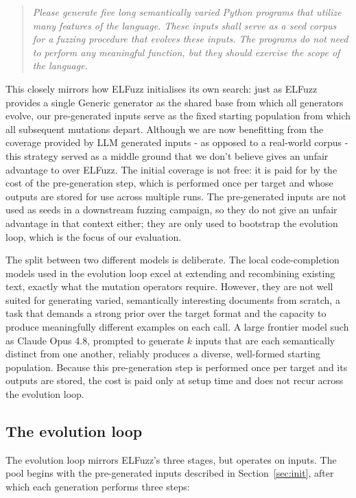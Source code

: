 \begin{quote}
\itshape Please generate five long semantically varied Python programs that utilize many features of the language. These inputs shall serve as a seed corpus for a fuzzing procedure that evolves these inputs. The programs do not need to perform any meaningful function, but they should exercise the scope of the language.
\end{quote}

This closely mirrors how ELFuzz initialises its own search: just as ELFuzz provides a single Generic generator as the shared base from which all generators evolve, our pre-generated inputs serve as the fixed starting population from which all subsequent mutations depart. Although we are now benefitting from the coverage provided by LLM generated inputs - as opposed to a real-world corpus - this strategy served as a middle ground that we don't believe gives an unfair advantage to \toolname{} over ELFuzz. The initial coverage is not free: it is paid for by the cost of the pre-generation step, which is performed once per target and whose outputs are stored for use across multiple runs. The pre-generated inputs are not used as seeds in a downstream fuzzing campaign, so they do not give \toolname{} an unfair advantage in that context either; they are only used to bootstrap the evolution loop, which is the focus of our evaluation.

The split between two different models is deliberate. The local code-completion models used in the evolution loop excel at extending and recombining existing text, exactly what the mutation operators require. However, they are not well suited for generating varied, semantically interesting documents from scratch, a task that demands a strong prior over the target format and the capacity to produce meaningfully different examples on each call. A large frontier model such as Claude Opus 4.8, prompted to generate $k$ inputs that are each semantically distinct from one another, reliably produces a diverse, well-formed starting population. Because this pre-generation step is performed once per target and its outputs are stored, the cost is paid only at setup time and does not recur across the evolution loop.

\subsection{The evolution loop}

The evolution loop mirrors ELFuzz's three stages, but operates on inputs. The pool begins with the pre-generated inputs described in Section~\ref{sec:init}, after which each generation performs three steps:

